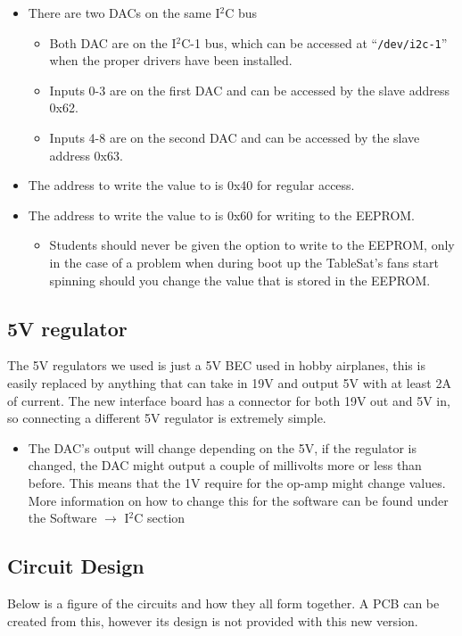 \documentclass{article}
\begin{document}
\begin{itemize}
    \item There are two DACs on the same I$^2$C bus
    \begin{itemize}
        \item Both DAC are on the I$^2$C-1 bus, which can be accessed at ``{\tt /dev/i2c-1}'' when the proper drivers have been installed.
        \item Inputs 0-3 are on the first DAC and can be accessed by the slave address 0x62.
        \item Inputs 4-8 are on the second DAC and can be accessed by the slave address 0x63.
    \end{itemize}
    \item The address to write the value to is 0x40 for regular access.
    \item The address to write the value to is 0x60 for writing to the EEPROM.
    \begin{itemize}
        \item Students should never be given the option to write to the EEPROM, only in the case of a problem when during boot up the TableSat's fans start spinning should you change the value that is stored in the EEPROM.
    \end{itemize}
\end{itemize}
\subsection{5V regulator}
The 5V regulators we used is just a 5V BEC used in hobby airplanes, this is easily replaced by anything that can take in 19V and output 5V with at least 2A of current. The new interface board has a connector for both 19V out and 5V in, so connecting a different 5V regulator is extremely simple.

\begin{itemize}
    \item The DAC's output will change depending on the 5V, if the regulator is changed, the DAC might output a couple of millivolts more or less than before. This means that the 1V require for the op-amp might change values. More information on how to change this for the software can be found under the Software $\rightarrow$ I$^2$C section
\end{itemize}
\subsection{Circuit Design}

Below is a figure of the circuits and how they all form together. A PCB can be created from this, however its design is not provided with this new version.
\end{document}
